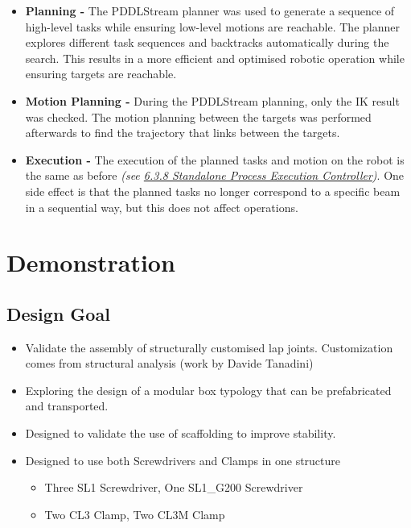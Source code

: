 \begin{itemize}
	\item \textbf{Planning - }The PDDLStream planner was used to generate a sequence of high-level tasks while ensuring low-level motions are reachable. The planner explores different task sequences and backtracks automatically during the search. This results in a more efficient and optimised robotic operation while ensuring targets are reachable.

	\item \textbf{Motion Planning - }During the PDDLStream planning, only the IK result was checked. The motion planning between the targets was performed afterwards to find the trajectory that links between the targets.

	\item \textbf{Execution - }The execution of the planned tasks and motion on the robot is the same as before \textit{(see \ul{6.3.8 Standalone Process Execution Controller})}. One side effect is that the planned tasks no longer correspond to a specific beam in a sequential way, but this does not affect operations.

\end{itemize}
\section{Demonstration}

\subsection{Design Goal}

\begin{itemize}
	\item Validate the assembly of structurally customised lap joints. Customization comes from structural analysis (work by Davide Tanadini)

	\item Exploring the design of a modular box typology that can be prefabricated and transported.

	\item Designed to validate the use of scaffolding to improve stability.

	\item Designed to use both Screwdrivers and Clamps in one structure

\begin{itemize}
	\item Three SL1 Screwdriver, One SL1\_G200 Screwdriver

	\item Two CL3 Clamp, Two CL3M Clamp

\end{itemize}
\end{itemize}
